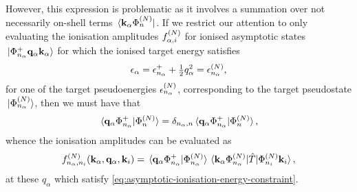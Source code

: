 \documentclass[]{article}
\begin{document}
However, this expression is problematic as it involves a summation over
not necessarily on-shell terms $\bra*{\vb{k}_{\alpha}\Phi_{n}^{(N)}}$.
If we restrict our attention to only evaluating the ionisation amplitudes
$f_{\alpha, i}^{(N)}$ for ionised asymptotic states
$\ket*{\Phi_{n_{\alpha}}^{+} \vb{q}_{\alpha} \vb{k}_{\alpha}}$ for which the
ionised target energy satisfies
\begin{equation}
  \label{eq:asymptotic-ionisation-energy-constraint}
  \epsilon_{\alpha}
  =
  \epsilon_{n_{\alpha}}^{+}
  +
  \tfrac{1}{2}
  q_{\alpha}^{2}
  =
  \epsilon_{n_{\alpha}}^{(N)}
  ,
\end{equation}
for one of the target pseudoenergies $\epsilon_{n_{\alpha}}^{(N)}$,
corresponding to the target pseudostate $\ket*{\Phi_{n_{\alpha}}^{(N)}}$, then
we must have that
\begin{equation}
  \label{eq:asymptotic-ionisation-overlap}
  \braket*
  {\vb{q}_{\alpha} \Phi_{n_{\alpha}}^{+}}
  {\Phi_{n}^{(N)}}
  =
  \delta_{n_{\alpha}, n}
  \braket*
  {\vb{q}_{\alpha} \Phi_{n_{\alpha}}^{+}}
  {\Phi_{n}^{(N)}}
  ,
\end{equation}
whence the ionisation amplitudes can be evaluated as
\begin{equation}
  \label{eq:scattering-amplitude-ionisation-evaluated}
  f_{n_{\alpha}, n_{i}}^{(N)}(
    \vb{k}_{\alpha}, \vb{q}_{\alpha}, \vb{k}_{i}
  )
  =
  \braket*
  {\vb{q}_{\alpha} \Phi_{n_{\alpha}}^{+}}
  {\Phi_{n_{\alpha}}^{(N)}}
  \mel*
  {\vb{k}_{\alpha} \Phi_{n_{\alpha}}^{(N)}}
  {\hat{T}}
  {\Phi_{n_{i}}^{(N)} \vb{k}_{i}}
  ,
\end{equation}
at these $q_{\alpha}$ which satisfy
\eqref{eq:asymptotic-ionisation-energy-constraint}.
\end{document}
